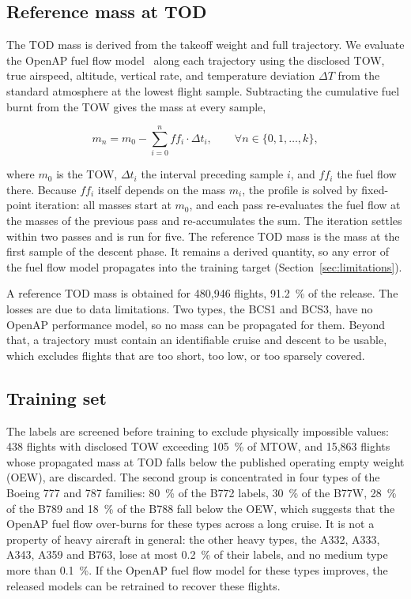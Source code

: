 \documentclass[
  manuscript=proceedings,  %
  layout=preprint,  %
  year=2026,
  volume=x,
]{extra/joas}
\begin{document}
\subsection{Reference mass at TOD}
\label{sec:label}

The TOD mass is derived from the takeoff weight and full trajectory. We evaluate the OpenAP fuel flow model~\cite{openap} along each trajectory using the disclosed TOW, true airspeed, altitude, vertical rate, and temperature deviation $\Delta T$ from the standard atmosphere at the lowest flight sample. Subtracting the cumulative fuel burnt from the TOW gives the mass at every sample,

\begin{equation}
    \label{eqn:ff_from_tow}
    m_n = m_0 - \sum_{i=0}^{n} ff_i \cdot \Delta t_i ,
    \qquad \forall n \in \{0, 1, \ldots, k\},
\end{equation}

\noindent where $m_0$ is the TOW, $\Delta t_i$ the interval preceding sample $i$, and $ff_i$ the fuel flow there. Because $ff_i$ itself depends on the mass $m_i$, the profile is solved by fixed-point iteration: all masses start at $m_0$, and each pass re-evaluates the fuel flow at the masses of the previous pass and re-accumulates the sum. The iteration settles within two passes and is run for five. The reference TOD mass is the mass at the first sample of the descent phase. It remains a derived quantity, so any error of the fuel flow model propagates into the training target (Section~\ref{sec:limitations}).


A reference TOD mass is obtained for 480{,}946 flights, 91.2~\% of the release. The losses are due to data limitations. Two types, the BCS1 and BCS3, have no OpenAP performance model, so no mass can be propagated for them. Beyond that, a trajectory must contain an identifiable cruise and descent to be usable, which excludes flights that are too short, too low, or too sparsely covered.

\subsection{Training set}
\label{sec:trainingset}

The labels are screened before training to exclude physically impossible values: 438 flights with disclosed TOW exceeding 105~\% of MTOW, and 15{,}863 flights whose propagated mass at TOD falls below the published operating empty weight (OEW), are discarded. The second group is concentrated in four types of the Boeing 777 and 787 families: 80~\% of the B772 labels, 30~\% of the B77W, 28~\% of the B789 and 18~\% of the B788 fall below the OEW, which suggests that the OpenAP fuel flow over-burns for these types across a long cruise. It is not a property of heavy aircraft in general: the other heavy types, the A332, A333, A343, A359 and B763, lose at most 0.2~\% of their labels, and no medium type more than 0.1~\%. If the OpenAP fuel flow model for these types improves, the released models can be retrained to recover these flights.
\end{document}
